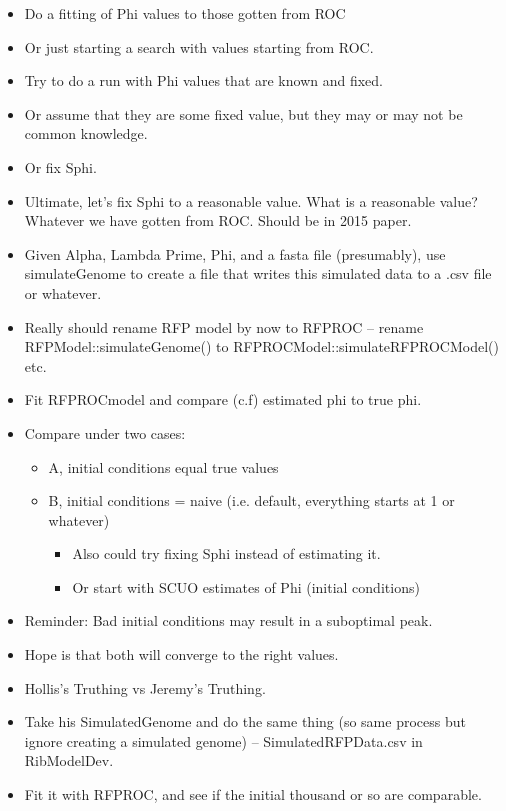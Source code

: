 \documentclass[12pt,hyperref]{labbook}
\newcommand{\sep}{\discretionary{}{}{}} %
\begin{document}
\begin{itemize}
    \item Do a fitting of Phi values to those gotten from ROC
    \item Or just starting a search with values starting from ROC.
    \item Try to do a run with Phi values that are known and fixed.
    \item Or assume that they are some fixed value, but they may or may not be common knowledge.
    \item Or fix Sphi.
    \item Ultimate, let's fix Sphi to a reasonable value. 
    What is a reasonable value? 
    Whatever we have gotten from ROC. 
    Should be in 2015 paper.
    \item Given Alpha, Lambda Prime, Phi, and a fasta file (presumably), use simulate\sep Genome to create a file that writes this simulated data to a .csv file or whatever.
    \item Really should rename RFP model by now to RFPROC -- rename RFP\sep Model\sep ::\sep simulate\sep Genome() to RFPROC\sep Model\sep ::\sep simulate\sep RFPROC\sep Model() etc.
    \item Fit RFPROCmodel and compare (c.f) estimated phi to true phi.
    \item Compare under two cases:
    \begin{itemize}
        \item A, initial conditions equal true values
        \item B, initial conditions = naive (i.e. default, everything starts at 1 or whatever)
        \begin{itemize}
            \item Also could try fixing Sphi instead of estimating it.
            \item Or start with SCUO estimates of Phi (initial conditions)
        \end{itemize}
    \end{itemize}
    \item Reminder: Bad initial conditions may result in a suboptimal peak.
    \item Hope is that both will converge to the right values. 
    \item Hollis's Truthing vs Jeremy's Truthing.
    \item Take his SimulatedGenome and do the same thing (so same process but ignore creating a simulated genome) -- SimulatedRFPData.csv in RibModelDev.
    \item Fit it with RFPROC, and see if the initial thousand or so are comparable.

\end{itemize}
\end{document}
